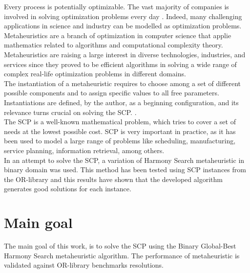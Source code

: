 Every process is potentially optimizable. The vast majority of companies is involved in solving optimization problems every day \cite{DBLP:books/daglib/0022645}. Indeed, many challenging applications in science and industry can be modelled as optimization problems.\\

Metaheuristics are a branch of optimization in computer science that applie mathematics related to algorithms and computational complexity theory. Metaheuristics are raising a large interest in diverse technologies, industries, and services since they proved to be efficient algorithms in solving a wide range of  complex real-life optimization problems in different domains.\\

The instantiation of a metaheuristic requires to choose among a set of different possible components and to assign specific values to all free parameters. Instantiations are defined, by the author, as a beginning configuration, and its relevance turns crucial on solving the SCP. \cite{DBLP:conf/gecco/BirattariSPV02}.\\

The SCP is a well-known mathematical problem, which tries to cover a set of needs at the lowest possible cost. SCP is very important in practice, as it has been used to model a large range of problems like scheduling, manufacturing, service planning, information retrieval, among others.\\

In an attempt to solve the SCP, a variation of Harmony Search metaheuristic in binary domain  was used. This method has been tested using SCP instances from the OR-library \cite{citeulike:921349} and this results have shown that the developed algorithm generates good solutions for each instance.

\section{Main goal}
The main goal of this work, is to solve the SCP using the Binary Global-Best Harmony Search metaheuristic algorithm. The performance of metaheuristic is validated against OR-library benchmarks resolutions.


